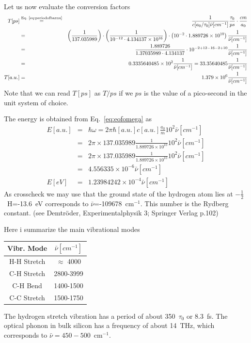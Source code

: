 \documentclass[final,12pt,makeidx,DIV=calc]{article}
\begin{document}
{{{{{{Let us now evaluate the conversion factors
\begin{eqnarray*}
T[ps]&\stackrel{\textrm{Eq.~\ref{eq:periodofbarnu}}}{=}& \frac{1}{c[a_0/\tau_0]\bar{\nu}[cm^{-1}] } 
\frac{\tau_0}{ps}\cdot\frac{cm}{a_0}
\\
&=&
\left(\frac{1}{137.035989}\right)\cdot
\left(\frac{1}{10^{-12}\cdot 4.134137\times 10^{16}}\right)
\cdot\left(10^{-2}\cdot 1.889726\times 10^{10}\right)
\frac{1}{\bar{\nu}[cm^{-1}] } 
\\
&=&
\frac{1.889726}{1.37035989\cdot4.134137}\cdot10^{-2+12-16-2+10}
\frac{1}{\bar{\nu}[cm^{-1}] } 
\\
&=&0.3335640485\times10^{2}
\frac{1}{\bar{\nu}[cm^{-1}] } 
=33.35640485\frac{1}{\bar{\nu}[cm^{-1}] }
\\
T[a.u.]&=&1.379\times 10^6 \frac{1}{\bar{\nu}[cm^{-1}] }
\end{eqnarray*}
Note that we can read $T[ps]$ as $T/ps$ if we $ps$ is the value of a
pico-second in the unit system of choice.

The energy is obtained from Eq.~\ref{eq:eofomega} as
\begin{eqnarray*}
E[a.u.]&=&\hbar\omega=2\pi\hbar[a.u.] c[a.u.]\frac{a_0}{m}
10^2
\bar{\nu}[cm^{-1}]
\\
&=&2\pi\times 137.035989\frac{1}{1.889726\times 10^{10}}10^2\bar{\nu}[cm^{-1}]
\\
&=&2\pi\times 137.035989\frac{1}{1.889726\times 10^{10}}10^2\bar{\nu}[cm^{-1}]
\\
&=&4.556335\times10^{-6}\bar{\nu}[cm^{-1}]
\\
E[eV]&=&1.23984242\times10^{-4}\bar{\nu}[cm^{-1}]
\end{eqnarray*}
As crosscheck we may use that the ground state of the hydrogen atom lies at
$-\frac{1}{2}$~H=-13.6~eV corresponds to $\bar{\nu}$=-109678~cm$^{-1}$. This
number is the Rydberg constant. (see Demtr\"oder, Experimentalphysik 3;
Springer Verlag p.102)

Here i summarize the main vibrational modes
\begin{center}
\begin{tabular}{|c|c|}
\hline
Vibr. Mode & $\bar{\nu}[cm^{-1}]$\\ 
\hline
H-H Stretch & $\approx$ 4000\\
C-H Stretch & 2800-3999 \\
C-H Bend    & 1400-1500 \\
C-C Stretch & 1500-1750 \\
\hline
\end{tabular}
\end{center}
The hydrogen stretch vibration has a period of about 350~$\tau_0$ or 8.3~fs.
The optical phonon in bulk silicon has a frequency of about 14~THz, which
corresponds to $\bar{\nu}=450-500$~cm$^{-1}$.

}}}}}}
\end{document}

